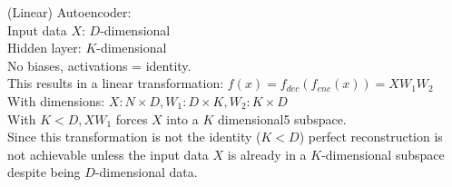 %
%
%

%
%
%
\begin{flushleft}
(Linear) Autoencoder:
\\
Input data $X$: $D$-dimensional\\
Hidden layer: $K$-dimensional\\
No biases, activations = identity.\\
This results in a linear transformation: $f(x) = f_{dec}(f_{enc}(x))= X W_1 W_2$\\
With dimensions: $X: N \times D, W_1: D \times K, W_2: K \times D$\\
With $K < D, X W_1$ forces $X$ into a $K$ dimensional5 subspace.\\
Since this transformation is not the identity ($K < D$) perfect reconstruction is
not achievable unless the input data $X$ is already in a $K$-dimensional 
subspace despite being $D$-dimensional data.
\\
\end{flushleft}
%
%
%
